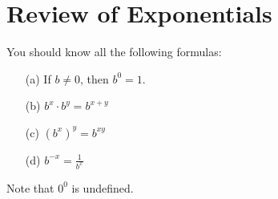 \section{Review of Exponentials}

You should know all the following formulas:

\begin{thm} \mbox{}
\begin{itemize}
\item[(a)] If $b \neq 0$, then $b^0 = 1$.
\item[(b)] $b^x \cdot b^y = b^{x + y}$
\item[(c)] $(b^x)^y = b^{xy}$
\item[(d)] $b^{-x} = \frac{1}{b^x}$
\end{itemize}
\end{thm}

Note that $0^0$ is undefined. 
